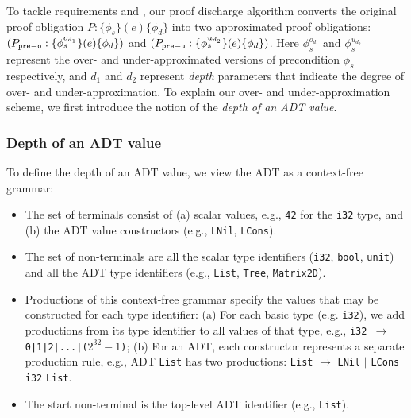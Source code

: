 To tackle requirements  and ,
our proof discharge algorithm converts the
original proof obligation
$P: \{\phi_s\} (e) \{\phi_d\}$
into two approximated proof obligations:
$(P_{{\tt pre-o}}: \{\phi^{o_{d_1}}_s\} (e) \{\phi_d\})$
and
$(P_{{\tt pre-u}}: \{\phi^{u_{d_2}}_s\} (e) \{\phi_d\})$. Here
$\phi^{o_{d_1}}_s$ and
$\phi^{u_{d_2}}_s$ represent the over- and under-approximated
versions of precondition $\phi_s$ respectively, and $d_1$ and $d_2$ represent
{\em depth} parameters that indicate the degree of over- and
under-approximation.
To explain
our over- and under-approximation scheme, we
first introduce the notion of the {\em depth of an ADT value}.



\subsubsection{Depth of an ADT value}
To define the depth of an ADT value,
we view the ADT as a context-free grammar:
\begin{itemize}
\item The set of terminals
consist of (a) scalar values, e.g., {\tt 42} for the {\tt i32} type, and
(b) the ADT value constructors (e.g., {\tt LNil}, {\tt LCons}).
\item The set of non-terminals are all the scalar type identifiers ({\tt i32}, {\tt bool}, {\tt unit})
and all the ADT type identifiers (e.g., {\tt List}, {\tt Tree}, {\tt Matrix2D}).
\item Productions of this context-free grammar specify the values that may be constructed for each type identifier: (a) For each basic type (e.g. {\tt i32}), we add productions from its type identifier to all values of that type, e.g., {\tt i32 $\rightarrow$ 0|1|2|...|($2^{32}-1$)};
(b) For an ADT, each constructor represents a separate production rule,
e.g., ADT {\tt List} has two productions: {\tt List} $\rightarrow$ {\tt LNil} $|$ {\tt LCons} {\tt i32} {\tt List}.
\item The start non-terminal is the top-level ADT identifier (e.g., {\tt List}).
\end{itemize}
